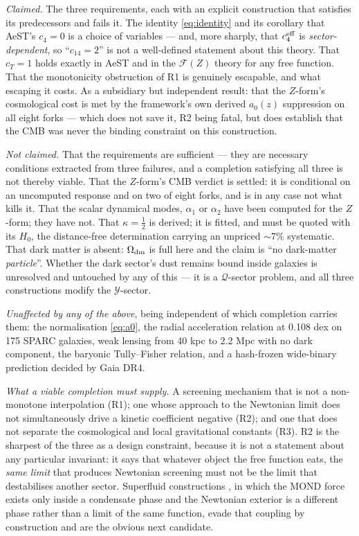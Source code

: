 \documentclass[aps,prd,twocolumn,10pt,nofootinbib,superscriptaddress]{revtex4-2}
\newcommand{\FF}{\mathcal{F}}
\newcommand{\YY}{\mathcal{Y}}
\newcommand{\QQ}{\mathcal{Q}}
\begin{document}
\emph{Claimed.} The three requirements, each with an explicit construction that satisfies its
predecessors and fails it. The identity \eqref{eq:identity} and its corollary that AeST's $c_4=0$
is a choice of variables --- and, more sharply, that $c_4^{\rm eff}$ is \emph{sector-dependent},
so ``$c_{14}=2$'' is not a well-defined statement about this theory. That $c_T=1$ holds exactly in
AeST and in the $\FF(Z)$ theory for any free function. That the monotonicity obstruction of R1 is
genuinely escapable, and what escaping it costs. As a subsidiary but independent result: that the
$Z$-form's cosmological cost is met by the framework's own derived $a_0(z)$ suppression on all
eight forks --- which does not save it, R2 being fatal, but does establish that the CMB was never
the binding constraint on this construction.

\emph{Not claimed.} That the requirements are sufficient --- they are necessary conditions
extracted from three failures, and a completion satisfying all three is not thereby viable. That
the $Z$-form's CMB verdict is settled: it is conditional on an uncomputed response and on two of
eight forks, and is in any case not what kills it. That the scalar dynamical modes, $\alpha_1$ or
$\alpha_2$ have been computed for the $Z$-form; they have not. That
$\kappa=\tfrac12$ is derived; it is fitted, and must be quoted with its $H_0$, the distance-free
determination carrying an unpriced $\sim7\%$ systematic. That dark matter is absent: $\Omega_{\rm
dm}$ is full here and the claim is ``no dark-matter \emph{particle}''. Whether the dark sector's
dust remains bound inside galaxies is unresolved and untouched by any of this --- it is a
$\QQ$-sector problem, and all three constructions modify the $\YY$-sector.

\emph{Unaffected by any of the above}, being independent of which completion carries them: the
normalisation \eqref{eq:a0}, the radial acceleration relation at 0.108 dex on 175 SPARC galaxies,
weak lensing from 40 kpc to 2.2 Mpc with no dark component, the baryonic Tully--Fisher relation,
and a hash-frozen wide-binary prediction decided by Gaia DR4.

\emph{What a viable completion must supply.} A screening mechanism that is not a non-monotone
interpolation (R1); one whose approach to the Newtonian limit does not simultaneously drive a
kinetic coefficient negative (R2); and one that does not separate the cosmological and local
gravitational constants (R3). R2 is the sharpest of the three as a design constraint, because it
is not a statement about any particular invariant: it says that whatever object the free function
eats, the \emph{same limit} that produces Newtonian screening must not be the limit that
destabilises another sector. Superfluid constructions \cite{BK2015}, in which the MOND force
exists only inside a condensate phase and the Newtonian exterior is a different phase rather than
a limit of the same function, evade that coupling by construction and are the obvious next
candidate.
\end{document}

